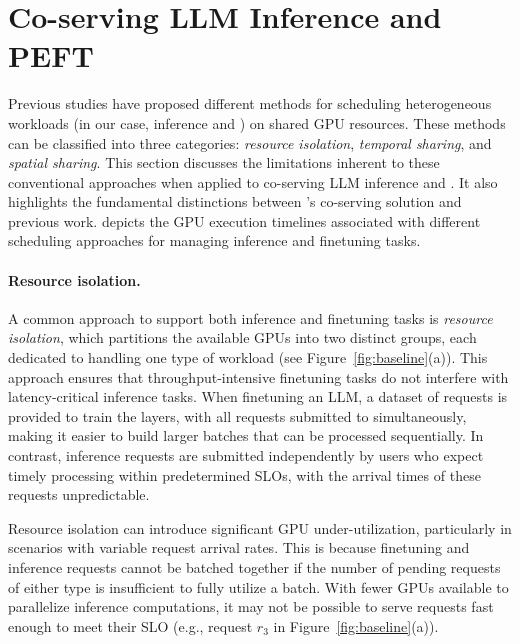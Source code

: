 \section{Co-serving LLM Inference and PEFT}
\label{sec:coserving}

Previous studies have proposed different methods for scheduling heterogeneous workloads (in our case, inference and \peft) on shared GPU resources. These methods can be classified into three categories: \textit{resource isolation}, \textit{temporal sharing}, and \textit{spatial sharing}.
%
This section discusses the limitations inherent to these conventional approaches when applied to co-serving LLM inference and \peft. It also highlights the fundamental distinctions between \sys's co-serving solution and previous work.
 depicts the GPU execution timelines associated with different scheduling approaches for managing inference and finetuning tasks.

\paragraph{Resource isolation.}
A common approach to support both inference and finetuning tasks is \textit{resource isolation}, which partitions the available GPUs into two distinct groups, each dedicated to handling one type of workload (see Figure~\ref{fig:baseline}(a)).
This approach ensures that throughput-intensive finetuning tasks do not interfere with latency-critical inference tasks. 
When finetuning an LLM, a dataset of requests is provided to train the \peft layers, with all requests submitted to \sys simultaneously, making it easier to build larger batches that can be processed sequentially. In contrast, inference requests are submitted independently by users who expect timely processing within predetermined SLOs, with the arrival times of these requests unpredictable.

Resource isolation can introduce significant GPU under-utilization, particularly in scenarios with variable request arrival rates. This is because finetuning and inference requests cannot be batched together if the number of pending requests of either type is insufficient to fully utilize a batch. With fewer GPUs available to parallelize inference computations, it may not be possible to serve requests fast enough to meet their SLO (e.g., request $r_3$ in Figure~\ref{fig:baseline}(a)).

